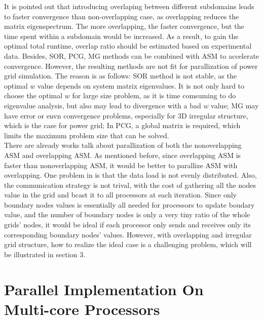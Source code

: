 \documentclass{sig-alternate}
\begin{document}
	It is pointed out that introducing overlaping between different subdomains leads to faster convergence than non-overlapping case, 
	as overlapping reduces the matrix eigenspectrum\cite{Klawonn}\cite{Taopeng}. The more overlapping, the faster convergence,
	but the time spent within a subdomain would be increased. As a result, to gain the optimal total runtime, overlap ratio should 
	be estimated based on experimental data. Besides, 
	SOR, PCG, MG methods can be combined with ASM to accelerate convergence. However, the resulting methods are not fit for 
	parallization of power grid simulation. The reason is as follows: SOR method is not 
	stable, as the optimal $w$ value depends on system matrix eigenvalues. It is not only hard to choose the optimal $w$ for large
	size problem, as it is time comsuming to do eigenvalue analysis, but also may lead to divergence with a bad $w$ value; MG may have
	error or envn convergence problems, especially for 3D irregular structure, which is the case for power grid; In PCG, a global
	matrix is required, which limits the maximum problem size that can be solved.\\ 
	 
	There are already works talk about parallization of both the 
	nonoverlapping ASM\cite{Daoqiyang} and overlapping ASM\cite{kaisun}. As mentioned before, since overlapping ASM is faster than 
	nonoverlapping ASM, it would be better to parallize ASM with overlapping. One problem in \cite{kaisun} is that the
	data load is not evenly distributed. Also, the communication strategy is not trival, with the cost of gathering all the
	nodes value in the grid and bcast it to all processors at each iteration. Since only boundary nodes values is essentially all 
	needed for processors to update boudary value, and the number of boundary nodes is only a very tiny ratio of the whole grids' 
	nodes, it would be ideal 
	if each processor only sends and receives only its corresponding boundary nodes' values. 
	However, with overlapping and irregular grid structure, how to realize the ideal case is a challenging problem, which will be
	illustrated in section 3.\\
 
\section{Parallel Implementation On \\Multi-core Processors}
\end{document}

